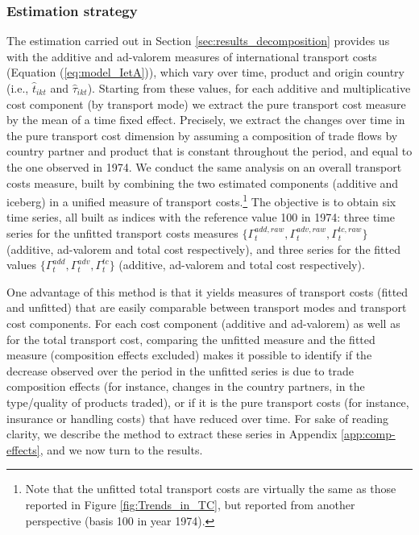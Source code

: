 \documentclass[a4paper,11pt]{article}
\begin{document}
\subsubsection{Estimation strategy}

The estimation carried out in Section \ref{sec:results_decomposition} provides us with the additive and ad-valorem measures of international transport costs (Equation (\ref{eq:model_IetA})), which vary over time, product and origin country (i.e., $\widehat{t}_{ikt}$ and $\widehat{\tau}_{ikt}$).
Starting from these values, for each additive and multiplicative cost component (by transport mode) we extract the pure transport cost measure by the mean of a time fixed effect.
Precisely, we extract the changes over time in the pure transport cost dimension by assuming a composition of trade flows by country partner and product that is constant throughout the period, and equal to the one observed in 1974.
We conduct the same analysis on an overall transport costs measure, built by combining the two estimated components (additive and iceberg) in a unified measure of transport costs.\footnote{Note that the unfitted total transport costs are virtually the same as those reported in Figure \ref{fig:Trends_in_TC}, but reported from another perspective (basis 100 in year 1974).} The objective is to obtain six time series, all built as indices with the reference value 100 in 1974: three time series for the unfitted transport costs measures $\{\Gamma^{add, raw}_t, \Gamma^{adv, raw}_t, \Gamma^{tc, raw}_t \}$  (additive, ad-valorem and total cost respectively), and three series for the fitted values $\{\Gamma^{add}_t, \Gamma^{adv}_t, \Gamma^{tc}_t \}$ (additive, ad-valorem and total cost respectively).

One advantage of this method is that it yields measures of transport costs (fitted and unfitted) that are easily comparable between transport modes and transport cost components.
For each cost component (additive and ad-valorem) as well as for the total transport cost, comparing the unfitted measure and the fitted measure (composition effects excluded) makes it possible to identify if the decrease observed over the period in the unfitted series is due to trade composition effects (for instance, changes in the country partners, in the type/quality of products traded), or if it is the pure transport costs (for instance, insurance or handling costs) that have reduced over time. For sake of reading clarity, we describe the method to extract these series in Appendix \ref{app:comp-effects}, and we now turn to the results.
\end{document}
